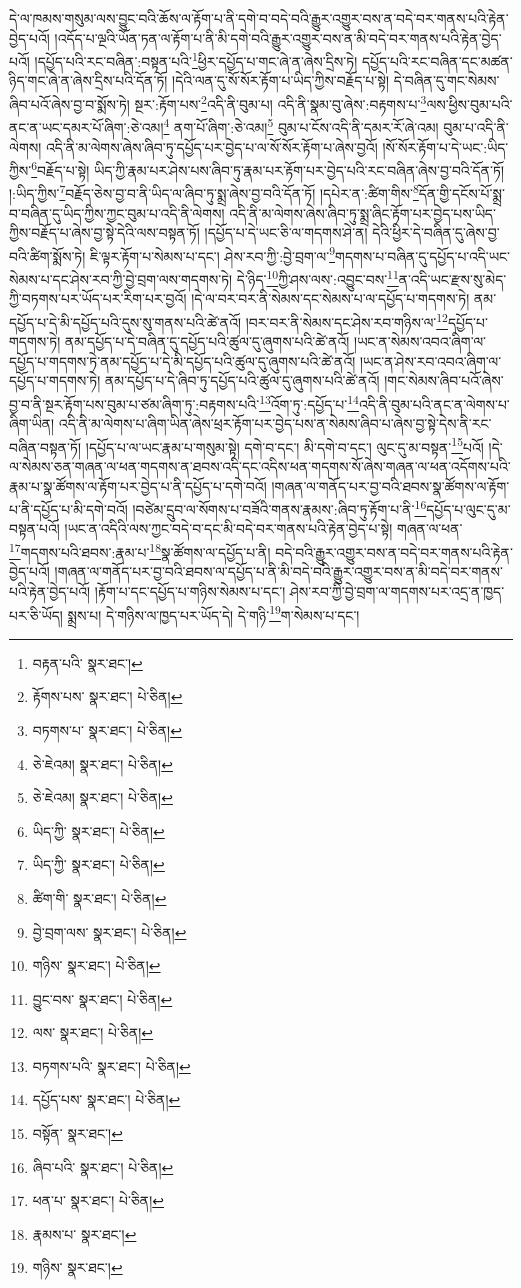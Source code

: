 དེ་ལ་ཁམས་གསུམ་ལས་བྱུང་བའི་ཆོས་ལ་རྟོག་པ་ནི་དགེ་བ་བདེ་བའི་རྒྱུར་འགྱུར་བས་ན་བདེ་བར་གནས་པའི་རྟེན་བྱེད་པའོ། །འདོད་པ་ལྔའི་ཡོན་ཏན་ལ་རྟོག་པ་ནི་མི་དགེ་བའི་རྒྱུར་འགྱུར་བས་ན་མི་བདེ་བར་གནས་པའི་རྟེན་བྱེད་པའོ། །དཔྱོད་པའི་རང་བཞིན་:བསྟན་པའི་\footnote{བརྟན་པའི་  སྣར་ཐང་། }ཕྱིར་དཔྱོད་པ་གང་ཞེ་ན་ཞེས་དྲིས་ཏེ། དཔྱོད་པའི་རང་བཞིན་དང་མཚན་ཉིད་གང་ཞེ་ན་ཞེས་དྲིས་པའི་དོན་ཏོ། །དེའི་ལན་དུ་སོ་སོར་རྟོག་པ་ཡིད་ཀྱིས་བརྗོད་པ་སྟེ། དེ་བཞིན་དུ་གང་སེམས་ཞིབ་པའོ་ཞེས་བྱ་བ་སྨོས་ཏེ། སྔར་:རྟོག་པས་\footnote{རྟོགས་པས་  སྣར་ཐང་།  པེ་ཅིན། }འདི་ནི་བུམ་པ། འདི་ནི་སྣམ་བུ་ཞེས་:བརྟགས་པ་\footnote{བཏགས་པ་  སྣར་ཐང་།  པེ་ཅིན། }ལས་ཕྱིས་བུམ་པའི་ནང་ན་ཡང་དམར་པོ་ཞིག་:ཅེ་འམ།\footnote{ཅེ་ཇེའམ།  སྣར་ཐང་།  པེ་ཅིན། } ནག་པོ་ཞིག་:ཅེ་འམ།\footnote{ཅེ་ཇེའམ།  སྣར་ཐང་།  པེ་ཅིན། } བུམ་པ་ངོས་འདི་ནི་དམར་རོ་ཞེ་འམ། བུམ་པ་འདི་ནི་ལེགས། འདི་ནི་མ་ལེགས་ཞེས་ཞིབ་ཏུ་དཔྱོད་པར་བྱེད་པ་ལ་སོ་སོར་རྟོག་པ་ཞེས་བྱའོ། །སོ་སོར་རྟོག་པ་དེ་ཡང་:ཡིད་ཀྱིས་\footnote{ཡིད་ཀྱི་  སྣར་ཐང་།  པེ་ཅིན། }བརྗོད་པ་སྟེ། ཡིད་ཀྱི་རྣམ་པར་ཤེས་པས་ཞིབ་ཏུ་རྣམ་པར་རྟོག་པར་བྱེད་པའི་རང་བཞིན་ཞེས་བྱ་བའི་དོན་ཏོ། །:ཡིད་ཀྱིས་\footnote{ཡིད་ཀྱི་  སྣར་ཐང་།  པེ་ཅིན། }བརྗོད་ཅེས་བྱ་བ་ནི་ཡིད་ལ་ཞིབ་ཏུ་སྨྲ་ཞེས་བྱ་བའི་དོན་ཏོ། །དཔེར་ན་:ཚིག་གིས་\footnote{ཚིག་གི་  སྣར་ཐང་།  པེ་ཅིན། }དོན་གྱི་དངོས་པོ་སྨྲ་བ་བཞིན་དུ་ཡིད་ཀྱིས་ཀྱང་བུམ་པ་འདི་ནི་ལེགས། འདི་ནི་མ་ལེགས་ཞེས་ཞིབ་ཏུ་སྨྲ་ཞིང་རྟོག་པར་བྱེད་པས་ཡིད་ཀྱིས་བརྗོད་པ་ཞེས་བྱ་སྟེ་དེའི་ལས་བསྟན་ཏོ། །དཔྱོད་པ་དེ་ཡང་ཅི་ལ་གདགས་ཤེ་ན། དེའི་ཕྱིར་དེ་བཞིན་དུ་ཞེས་བྱ་བའི་ཚིག་སྨོས་ཏེ། ཇི་ལྟར་རྟོག་པ་སེམས་པ་དང་། ཤེས་རབ་ཀྱི་:བྱེ་བྲག་ལ་\footnote{བྱེ་བྲག་ལས་  སྣར་ཐང་།  པེ་ཅིན། }གདགས་པ་བཞིན་དུ་དཔྱོད་པ་འདི་ཡང་སེམས་པ་དང་ཤེས་རབ་ཀྱི་བྱེ་བྲག་ལས་གདགས་ཏེ། དེ་ཉིད་\footnote{གཉིས་  སྣར་ཐང་།  པེ་ཅིན། }ཀྱི་ཤས་ལས་:འབྱུང་བས་\footnote{བྱུང་བས་  སྣར་ཐང་།  པེ་ཅིན། }ན་འདི་ཡང་རྫས་སུ་མེད་ཀྱི་བཏགས་པར་ཡོད་པར་རིག་པར་བྱའོ། །དེ་ལ་བར་བར་ནི་སེམས་དང་སེམས་པ་ལ་དཔྱོད་པ་གདགས་ཏེ། ནམ་དཔྱོད་པ་དེ་མི་དཔྱོད་པའི་དུས་སུ་གནས་པའི་ཚེ་ནའོ། །བར་བར་ནི་སེམས་དང་ཤེས་རབ་གཉིས་ལ་\footnote{ལས་  སྣར་ཐང་།  པེ་ཅིན། }དཔྱོད་པ་གདགས་ཏེ། ནམ་དཔྱོད་པ་དེ་བཞིན་དུ་དཔྱོད་པའི་ཚུལ་དུ་ཞུགས་པའི་ཚེ་ནའོ། །ཡང་ན་སེམས་འབའ་ཞིག་ལ་དཔྱོད་པ་གདགས་ཏེ་ནམ་དཔྱོད་པ་དེ་མི་དཔྱོད་པའི་ཚུལ་དུ་ཞུགས་པའི་ཚེ་ནའོ། །ཡང་ན་ཤེས་རབ་འབའ་ཞིག་ལ་དཔྱོད་པ་གདགས་ཏེ། ནམ་དཔྱོད་པ་དེ་ཞིབ་ཏུ་དཔྱོད་པའི་ཚུལ་དུ་ཞུགས་པའི་ཚེ་ནའོ། །གང་སེམས་ཞིབ་པའོ་ཞེས་བྱ་བ་ནི་སྔར་རྟོག་པས་བུམ་པ་ཙམ་ཞིག་ཏུ་:བརྟགས་པའི་\footnote{བཏགས་པའི་  སྣར་ཐང་།  པེ་ཅིན། }འོག་ཏུ་:དཔྱོད་པ་\footnote{དཔྱོད་པས་  སྣར་ཐང་།  པེ་ཅིན། }འདི་ནི་བུམ་པའི་ནང་ན་ལེགས་པ་ཞིག་ཡིན། འདི་ནི་མ་ལེགས་པ་ཞིག་ཡིན་ཞེས་ཕྲར་རྟོག་པར་བྱེད་པས་ན་སེམས་ཞིབ་པ་ཞེས་བྱ་སྟེ་དེས་ནི་རང་བཞིན་བསྟན་ཏོ། །དཔྱོད་པ་ལ་ཡང་རྣམ་པ་གསུམ་སྟེ། དགེ་བ་དང་། མི་དགེ་བ་དང་། ལུང་དུ་མ་བསྟན་\footnote{བསྟོན་  སྣར་ཐང་། }པའོ། །དེ་ལ་སེམས་ཅན་གཞན་ལ་ཕན་གདགས་ན་ཐབས་འདི་དང་འདིས་ཕན་གདགས་སོ་ཞེས་གཞན་ལ་ཕན་འདོགས་པའི་རྣམ་པ་སྣ་ཚོགས་ལ་རྟོག་པར་བྱེད་པ་ནི་དཔྱོད་པ་དགེ་བའོ། །གཞན་ལ་གནོད་པར་བྱ་བའི་ཐབས་སྣ་ཚོགས་ལ་རྟོག་པ་ནི་དཔྱོད་པ་མི་དགེ་བའོ། །བཙེམ་དྲུབ་ལ་སོགས་པ་བཟོའི་གནས་རྣམས་:ཞིབ་ཏུ་རྟོག་པ་ནི་\footnote{ཞིབ་པའི་  སྣར་ཐང་།  པེ་ཅིན། }དཔྱོད་པ་ལུང་དུ་མ་བསྟན་པའོ། །ཡང་ན་འདིའི་ལས་ཀྱང་བདེ་བ་དང་མི་བདེ་བར་གནས་པའི་རྟེན་བྱེད་པ་སྟེ། གཞན་ལ་ཕན་\footnote{ཕན་པ་  སྣར་ཐང་།  པེ་ཅིན། }གདགས་པའི་ཐབས་:རྣམ་པ་\footnote{རྣམས་པ་  སྣར་ཐང་། }སྣ་ཚོགས་ལ་དཔྱོད་པ་ནི། བདེ་བའི་རྒྱུར་འགྱུར་བས་ན་བདེ་བར་གནས་པའི་རྟེན་བྱེད་པའོ། །གཞན་ལ་གནོད་པར་བྱ་བའི་ཐབས་ལ་དཔྱོད་པ་ནི་མི་བདེ་བའི་རྒྱུར་འགྱུར་བས་ན་མི་བདེ་བར་གནས་པའི་རྟེན་བྱེད་པའོ། །རྟོག་པ་དང་དཔྱོད་པ་གཉིས་སེམས་པ་དང་། ཤེས་རབ་ཀྱི་བྱེ་བྲག་ལ་གདགས་པར་འདྲ་ན་ཁྱད་པར་ཅི་ཡོད། སྨྲས་པ། དེ་གཉིས་ལ་ཁྱད་པར་ཡོད་དེ། དེ་གཉི་\footnote{གཉིས་  སྣར་ཐང་། }ག་སེམས་པ་དང་། 